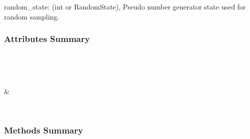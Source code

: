 \documentclass[letterpaper,10pt,english]{sphinxmanual}
\begin{document}
\begin{fulllineitems}
\begin{description}
\begin{description}
\end{description}

random\_state: (int or RandomState), Pseudo number generator state used for random sampling.

\end{description}
\subsubsection*{Attributes Summary}


\begin{savenotes}\sphinxatlongtablestart\begin{longtable}[c]{}
\hline

\endfirsthead

%
{}\\
\hline

\endhead

\hline
{}\\
\endfoot

\endlastfoot

{\hyperref[\detokenize{api/mastml.data_splitters.Bootstrap:mastml.data_splitters.Bootstrap.indices}]{}}
&

\\
\hline
\end{longtable}\sphinxatlongtableend\end{savenotes}
\subsubsection*{Methods Summary}


\begin{savenotes}\sphinxatlongtablestart\begin{longtable}[c]{}
\hline

\endfirsthead

%
{}\\
\hline

\endhead

\hline
{}\\
\endfoot


\end{longtable}
\end{savenotes}
\end{fulllineitems}
\end{document}
